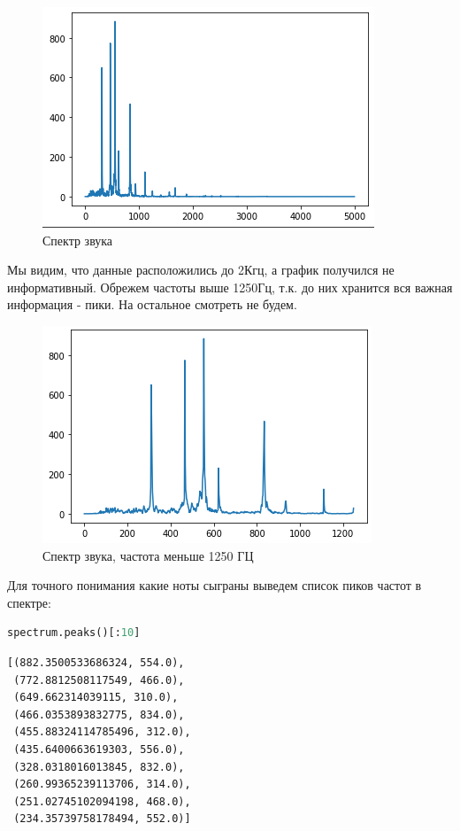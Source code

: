 \begin{figure}[H]
	\begin{center}
		\includegraphics[scale=1]{fig/lab01/lab1_2.png}
		\caption{Спектр звука}
	\end{center}
\end{figure}

Мы видим, что данные расположились до 2Кгц, а график получился не информативный. Обрежем частоты выше 1250Гц, т.к. до них хранится вся важная информация - пики. На остальное смотреть не будем.

\begin{figure}[H]
	\begin{center}
		\includegraphics[scale=1]{fig/lab01/lab1_3.png}
		\caption{Спектр звука, частота меньше 1250 ГЦ}
	\end{center}
\end{figure}

Для точного понимания какие ноты сыграны выведем список пиков частот в спектре:

\begin{lstlisting}[language=Python]
spectrum.peaks()[:10]
\end{lstlisting}

\begin{lstlisting}
[(882.3500533686324, 554.0),
 (772.8812508117549, 466.0),
 (649.662314039115, 310.0),
 (466.0353893832775, 834.0),
 (455.88324114785496, 312.0),
 (435.6400663619303, 556.0),
 (328.0318016013845, 832.0),
 (260.99365239113706, 314.0),
 (251.02745102094198, 468.0),
 (234.35739758178494, 552.0)]
\end{lstlisting}


